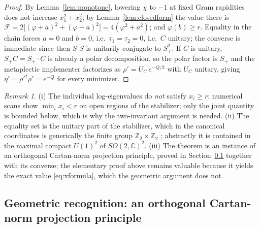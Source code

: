 \documentclass[11pt]{article}
\theoremstyle{definition}
\theoremstyle{remark}
\newtheorem{remark}[theorem]{Remark}
\newcommand{\C}{\mathbb{C}}
\newcommand{\Z}{\mathbb{Z}}
\newcommand{\dg}{\dagger}
\begin{document}
\begin{proof}
By Lemma~\ref{lem:monotone}, lowering $\chi$ to $-1$ at fixed Gram rapidities
does not increase $x_1^2+x_2^2$; by Lemma~\ref{lem:closedform} the value there
is $\mathcal F=2\big[(\varphi+a)^2+(\varphi-a)^2\big]=4(\varphi^2+a^2)$;
and $\varphi(b)\ge r$.  Equality in the chain
forces $a=0$ and $b=0$, i.e.\ $\tau_1=\tau_2=0$, i.e.\ $C$ unitary; the
converse is immediate since then $S^{\dg}S$ is unitarily conjugate to
$S_+^2$.  If $C$ is unitary, $S_+C=S_+\cdot C$ is already a polar
decomposition, so the polar factor is $S_+$ and the metaplectic implementer
factorizes as $\rho'=U_C\,e^{-Q/2}$ with $U_C$ unitary, giving
$\eta'=\rho'^{\dg}\rho'=e^{-Q}$ for every minimizer.
\end{proof}

\begin{remark}
(i) The individual log-eigenvalues do \emph{not} satisfy $x_i\ge r$: numerical
scans show $\min_i x_i<r$ on open regions of the stabilizer; only the joint
quantity is bounded below, which is why the two-invariant argument is needed.
(ii) The equality set is the unitary part of the stabilizer, which in the
canonical coordinates is generically the finite group $\Z_2\times\Z_2$
\cite{companion}; abstractly it is contained in the maximal compact
$U(1)^2$ of $SO(2,\C)^2$.
(iii) The theorem is an instance of an orthogonal Cartan-norm projection
principle, proved in Section~\ref{ssec:cartan} together with its converse;
the elementary proof above remains valuable because it yields the exact
value \eqref{eq:xformula}, which the geometric argument does not.
\end{remark}

\subsection{Geometric recognition: an orthogonal Cartan-norm projection
principle}\label{ssec:cartan}
\end{document}
